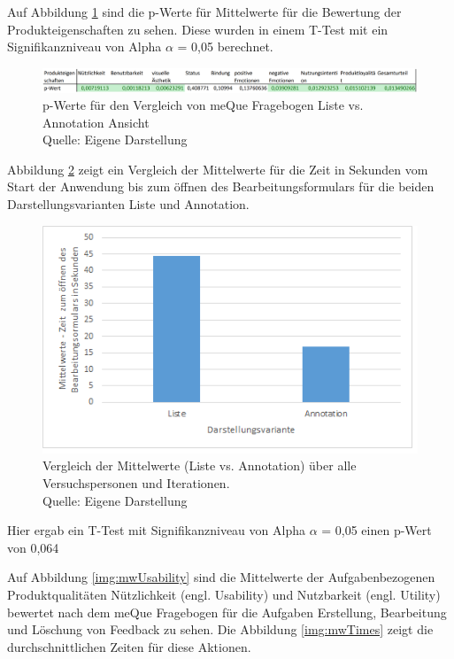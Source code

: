 Auf Abbildung \ref{img:pWerte} sind die p-Werte für Mittelwerte für die Bewertung der Produkteigenschaften zu sehen. Diese wurden in einem T-Test mit ein Signifikanzniveau von Alpha $\alpha$ = 0,05 berechnet. 

\begin{figure}[H]
	\centering
	\includegraphics[width=1.0\textwidth]{resources/evaluation/pWerte.png}
	\caption{p-Werte für den Vergleich von meQue Fragebogen Liste vs. Annotation Ansicht\\Quelle:  Eigene Darstellung}
	\label{img:pWerte}
\end{figure}

Abbildung \ref{img:mwListeAnno} zeigt ein Vergleich der Mittelwerte  für die Zeit in Sekunden vom Start der Anwendung bis zum öffnen des Bearbeitungsformulars für die beiden Darstellungsvarianten Liste und Annotation.  

\begin{figure}[H]
	\centering
	\includegraphics[width=.8\textwidth]{resources/evaluation/mittelwerte_liste_anno.png}
	\caption{Vergleich der Mittelwerte (Liste vs. Annotation) über alle Versuchspersonen und Iterationen. \\Quelle: Eigene Darstellung}
	\label{img:mwListeAnno}
\end{figure}

Hier ergab ein T-Test mit Signifikanzniveau von Alpha $\alpha$ = 0,05 einen p-Wert von 0,064

Auf Abbildung \ref{img:mwUsability} sind die Mittelwerte der Aufgabenbezogenen Produktqualitäten Nützlichkeit (engl. Usability) und Nutzbarkeit (engl. Utility) bewertet nach dem meQue Fragebogen für die 
Aufgaben Erstellung, Bearbeitung und Löschung von Feedback zu sehen. Die Abbildung \ref{img:mwTimes} zeigt die durchschnittlichen Zeiten für diese Aktionen.

